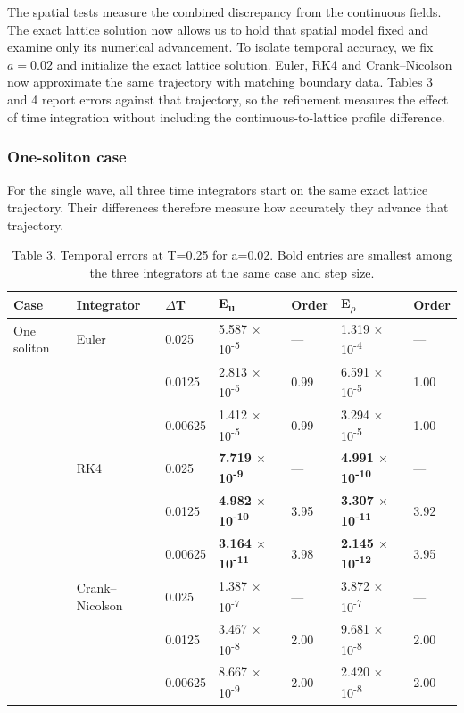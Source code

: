 \documentclass[11pt,a4paper]{article}
\begin{document}
The spatial tests measure the combined discrepancy from the continuous fields. The exact lattice solution now allows us to hold that spatial model fixed and examine only its numerical advancement. To isolate temporal accuracy, we fix \(a=0.02\) and initialize the exact lattice solution. Euler, RK4 and Crank–Nicolson now approximate the same trajectory with matching boundary data. Tables 3 and 4 report errors against that trajectory, so the refinement measures the effect of time integration without including the continuous-to-lattice profile difference.

\subsubsection*{One-soliton case}

For the single wave, all three time integrators start on the same exact lattice trajectory. Their differences therefore measure how accurately they advance that trajectory.

\begin{table}[!htbp]
\centering
\caption*{Table 3. Temporal errors at T=0.25 for a=0.02. Bold entries are smallest among the three integrators at the same case and step size.}
\small
\setlength{\tabcolsep}{4pt}
\renewcommand{\arraystretch}{1.22}
\begin{tabularx}{\linewidth}{YYYYYYY}
\toprule
Case & Integrator & \(\Delta\)T & E\textsubscript{u} & Order & E\textsubscript{\(\rho\)} & Order \\
\midrule
One soliton & Euler & 0.025 & 5.587 \(\times\) 10\textsuperscript{-5} & — & 1.319 \(\times\) 10\textsuperscript{-4} & — \\
 &  & 0.0125 & 2.813 \(\times\) 10\textsuperscript{-5} & 0.99 & 6.591 \(\times\) 10\textsuperscript{-5} & 1.00 \\
 &  & 0.00625 & 1.412 \(\times\) 10\textsuperscript{-5} & 0.99 & 3.294 \(\times\) 10\textsuperscript{-5} & 1.00 \\
 & RK4 & 0.025 & \textbf{7.719 \(\times\) 10\textsuperscript{-9}} & — & \textbf{4.991 \(\times\) 10\textsuperscript{-10}} & — \\
 &  & 0.0125 & \textbf{4.982 \(\times\) 10\textsuperscript{-10}} & 3.95 & \textbf{3.307 \(\times\) 10\textsuperscript{-11}} & 3.92 \\
 &  & 0.00625 & \textbf{3.164 \(\times\) 10\textsuperscript{-11}} & 3.98 & \textbf{2.145 \(\times\) 10\textsuperscript{-12}} & 3.95 \\
 & Crank–Nicolson & 0.025 & 1.387 \(\times\) 10\textsuperscript{-7} & — & 3.872 \(\times\) 10\textsuperscript{-7} & — \\
 &  & 0.0125 & 3.467 \(\times\) 10\textsuperscript{-8} & 2.00 & 9.681 \(\times\) 10\textsuperscript{-8} & 2.00 \\
 &  & 0.00625 & 8.667 \(\times\) 10\textsuperscript{-9} & 2.00 & 2.420 \(\times\) 10\textsuperscript{-8} & 2.00 \\
\bottomrule
\end{tabularx}
\end{table}
\end{document}
